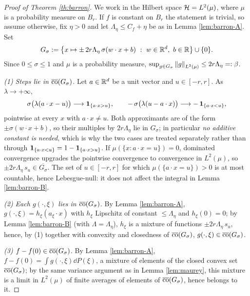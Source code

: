 \documentclass[11pt,a4paper]{article}
\begin{document}
\begin{proof}[Proof of Theorem \ref{th:barron}]
We work in the Hilbert space $\mathcal{H} = L^2(\mu)$, where $\mu$ is a probability measure on $B_r$. If
$f$ is constant on $B_r$ the statement is trivial, so assume otherwise, fix $\eta > 0$ and let
$\Lambda_\eta \le C_f + \eta$ be as in Lemma \ref{lem:barron-A}. Set
\[
G_\sigma := \big\{ x \mapsto \pm\, 2r \Lambda_\eta\, \sigma(w\cdot x + b)\ :\ w \in \mathbb{R}^d,\ b \in \mathbb{R} \big\} \cup \{0\}.
\]
Since $0 \le \sigma \le 1$ and $\mu$ is a probability measure,
$\sup_{g \in G_\sigma}\left\lVert g \right\rVert_{L^2(\mu)} \le 2r\Lambda_\eta =: \beta$.

\smallskip\noindent
\emph{(1) Steps lie in $\overline{\operatorname{co}}(G_\sigma)$.}
Let $a \in \mathbb{R}^d$ be a unit vector and $u \in [-r,r]$. As $\lambda \to +\infty$,
\[
\sigma\big(\lambda(a\cdot x - u)\big) \longrightarrow \mathbf{1}_{\{a\cdot x > u\}},
\qquad
-\,\sigma\big(\lambda(u - a\cdot x)\big) \longrightarrow -\,\mathbf{1}_{\{a\cdot x < u\}},
\]
pointwise at every $x$ with $a\cdot x \ne u$. Both approximants are of the form
$\pm\sigma(w\cdot x + b)$, so their multiples by $2r\Lambda_\eta$ lie in $G_\sigma$; in particular
\emph{no additive constant is needed}, which is why the two cases are treated separately rather
than through $\mathbf{1}_{\{a\cdot x<u\}} = 1 - \mathbf{1}_{\{a\cdot x>u\}}$. If $\mu(\{x : a\cdot x = u\}) = 0$,
dominated convergence upgrades the pointwise convergence to convergence in $L^2(\mu)$, so
$\pm 2r\Lambda_\eta\, s_u \in \overline{G_\sigma}$. The set of $u \in [-r,r]$ for which
$\mu(\{a\cdot x = u\}) > 0$ is at most countable, hence Lebesgue-null: it does not affect the
integral in Lemma \ref{lem:barron-B}.

\smallskip\noindent
\emph{(2) Each $g(\cdot,\xi)$ lies in $\overline{\operatorname{co}}(G_\sigma)$.}
By Lemma \ref{lem:barron-A}, $g(\cdot,\xi) = h_\xi(a_\xi \cdot x)$ with $h_\xi$ Lipschitz of
constant $\le \Lambda_\eta$ and $h_\xi(0)=0$; by Lemma \ref{lem:barron-B} (with
$\Lambda = \Lambda_\eta$), $h_\xi$ is a mixture of functions $\pm 2r\Lambda_\eta\, s_u$, hence, by
(1) together with convexity and closedness of $\overline{\operatorname{co}}(G_\sigma)$,
$g(\cdot,\xi) \in \overline{\operatorname{co}}(G_\sigma)$.

\smallskip\noindent
\emph{(3) $f - f(0) \in \overline{\operatorname{co}}(G_\sigma)$.}
By Lemma \ref{lem:barron-A}, $f - f(0) = \int g(\cdot,\xi)\dd P(\xi)$, a mixture of elements of the
closed convex set $\overline{\operatorname{co}}(G_\sigma)$; by the same variance argument as in
Lemma \ref{lem:maurey}, this mixture is a limit in $L^2(\mu)$ of finite averages of elements of
$\overline{\operatorname{co}}(G_\sigma)$, hence belongs to it.


\end{proof}
\end{document}
